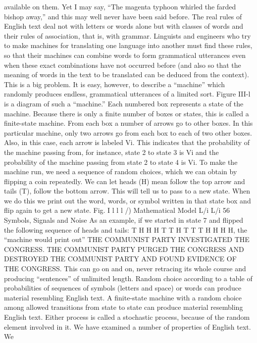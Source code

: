available on them. Yet I may say, “The magenta typhoon whirled
the farded bishop away,” and this may well never have been said
before.
The real rules of English text deal not with letters or words alone
but with classes of words and their rules of association, that is, with
grammar. Linguists and engineers who try to make machines for
translating one language into another must find these rules, so that
their machines can combine words to form grammatical utterances
even when these exact combinations have not occurred before
(and also so that the meaning of words in the text to be translated
can be deduced from the context). This is a big problem. It is easy,
however, to describe a “machine” which randomly produces endless,
grammatical utterances of a limited sort.
Figure III-l is a diagram of such a “machine.” Each numbered
box represents a state of the machine. Because there is only a finite
number of boxes or states, this is called a finite-state machine.
From each box a number of arrows go to other boxes. In this
particular machine, only two arrows go from each box to each of
two other boxes. Also, in this case, each arrow is labeled Vi. This
indicates that the probability of the machine passing from, for
instance, state 2 to state 3 is Vi and the probability of the machine
passing from state 2 to state 4 is Vi.
To make the machine run, we need a sequence of random
choices, which we can obtain by flipping a coin repeatedly. We can
let heads (H) mean follow the top arrow and tails (T), follow the
bottom arrow. This will tell us to pass to a new state. When we do
this we print out the word, words, or symbol written in that state
box and flip again to get a new state.
Fig. I l l l
/) Mathematical Model
L/i L/i
56
Symbols, Signals and Noise
As an example, if we started in state 7 and flipped the following
sequence of heads and tails: T H H H T T H T T T H H H
H, the “machine would print out”
THE COMMUNIST PARTY INVESTIGATED THE CONGRESS.
THE COMMUNIST PARTY PURGED THE CONGRESS AND
DESTROYED THE COMMUNIST PARTY AND FOUND
EVIDENCE OF THE CONGRESS.
This can go on and on, never retracing its whole course and
producing “sentences” of unlimited length.
Random choice according to a table of probabilities of sequences
of symbols (letters and space) or words can produce material
resembling English text. A finite-state machine with a random
choice among allowed transitions from state to state can produce
material resembling English text. Either process is called a stochastic
process, because of the random element involved in it.
We have examined a number of properties of English text. We
